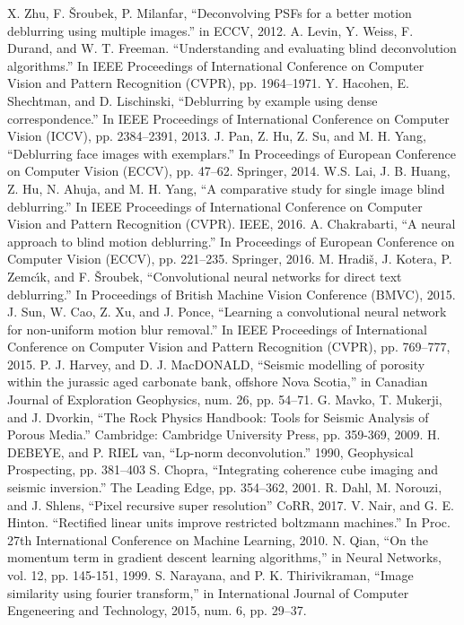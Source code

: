 \documentclass[conference]{IEEEtran}
\begin{document}
\begin{thebibliography}{00}
		X. Zhu, F. Šroubek, P. Milanfar, ``Deconvolving PSFs for a better motion deblurring using multiple images.'' in ECCV, 2012.
			A. Levin, Y. Weiss, F. Durand, and W. T. Freeman. ``Understanding and evaluating blind deconvolution algorithms.'' In IEEE Proceedings of International Conference on Computer Vision and Pattern Recognition (CVPR), pp. 1964–1971.
		Y. Hacohen, E. Shechtman, and D. Lischinski, ``Deblurring by example using dense correspondence.'' In IEEE Proceedings of International Conference on Computer Vision (ICCV), pp. 2384–2391, 2013.
		J. Pan, Z. Hu, Z. Su, and M. H. Yang, ``Deblurring face images with exemplars.'' In Proceedings of European Conference on Computer Vision (ECCV), pp. 47–62. Springer, 2014.
		W.S. Lai, J. B. Huang, Z. Hu, N. Ahuja, and M. H. Yang, ``A comparative study for single image blind deblurring.'' In IEEE Proceedings of International Conference on Computer Vision and Pattern Recognition (CVPR). IEEE, 2016.
	A. Chakrabarti, ``A neural approach to blind motion deblurring.'' In Proceedings of European Conference on Computer Vision (ECCV), pp. 221–235. Springer, 2016.
		M. Hradiš, J. Kotera, P. Zemcı́k, and F. Šroubek, ``Convolutional neural networks for direct text deblurring.'' In Proceedings of British Machine Vision Conference (BMVC), 2015.
		J. Sun, W. Cao, Z. Xu, and J. Ponce, ``Learning a convolutional neural network for non-uniform motion blur removal.'' In IEEE Proceedings of International Conference on Computer Vision and Pattern Recognition (CVPR), pp. 769–777, 2015.
 		P. J. Harvey, and D. J. MacDONALD, ``Seismic modelling of porosity within the jurassic aged carbonate bank, offshore Nova Scotia,'' in  Canadian Journal of Exploration Geophysics, num. 26, pp. 54–71.
		G. Mavko, T. Mukerji, and J. Dvorkin, ``The Rock Physics Handbook: Tools for Seismic Analysis of Porous Media.'' Cambridge: Cambridge University Press, pp. 359-369, 2009.
		H. DEBEYE, and P. RIEL van, ``Lp-norm deconvolution.'' 1990, Geophysical Prospecting, pp. 381–403
		S. Chopra, ``Integrating coherence cube imaging and seismic inversion.'' The Leading Edge, pp. 354–362, 2001.
		R. Dahl, M. Norouzi, and J. Shlens, ``Pixel recursive super resolution'' CoRR, 2017.
 		V. Nair, and G. E. Hinton. ``Rectified linear units improve restricted boltzmann machines.'' In Proc. 27th International Conference on Machine Learning, 2010.
		N. Qian, ``On the momentum term in gradient descent learning algorithms,'' in Neural Networks, vol. 12, pp. 145-151, 1999.
		S. Narayana, and P. K. Thirivikraman, ``Image similarity using fourier transform,'' in International Journal of Computer Engeneering and Technology, 2015, num. 6, pp. 29–37.
\end{thebibliography}
\end{document}
